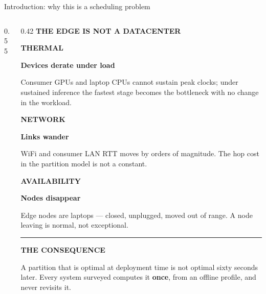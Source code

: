 \documentclass[aspectratio=169,9pt]{beamer}
\newcommand{\kicker}[1]{{\scriptsize\color{keBlue}\bfseries\MakeUppercase{#1}}\par\vspace{0.2em}}
\newcommand{\hl}[1]{\textbf{\color{keNavy}#1}}
\newenvironment{callout}[2][keBlue]{%
  \begin{beamercolorbox}[wd=\textwidth, sep=6pt, leftskip=4pt]{}%
  \setlength{\fboxrule}{0pt}%
  {\color{#1}\rule{2.5pt}{1.1em}}\hspace{0.5em}%
  {\scriptsize\color{#1}\bfseries\MakeUppercase{#2}}\par\vspace{0.25em}%
  \small
}{\end{beamercolorbox}}
\begin{document}
\begin{frame}[shrink=25]{Introduction: why this is a scheduling problem}
\begin{columns}[T]
\begin{column}{0.55\textwidth}
    \end{column}
    \begin{column}{0.42\textwidth}
      \kicker{The edge is not a datacenter}
      \scriptsize
      {\color{keOrange}\bfseries THERMAL}\par
      {\color{keNavy}\bfseries Devices derate under load}\par
      {\color{keMuted} Consumer GPUs and laptop CPUs cannot sustain peak clocks;
      under sustained inference the fastest stage becomes the bottleneck with no
      change in the workload.}
      \vspace{0.5em}

      {\color{keBlue}\bfseries NETWORK}\par
      {\color{keNavy}\bfseries Links wander}\par
      {\color{keMuted} WiFi and consumer LAN RTT moves by orders of magnitude.
      The hop cost in the partition model is not a constant.}
      \vspace{0.5em}

      {\color{keRed}\bfseries AVAILABILITY}\par
      {\color{keNavy}\bfseries Nodes disappear}\par
      {\color{keMuted} Edge nodes are laptops --- closed, unplugged, moved out of
      range. A node leaving is normal, not exceptional.}
      \vspace{0.6em}

      \begin{callout}[keNavy]{the consequence}
        \scriptsize A partition that is optimal at deployment time is not optimal
        sixty seconds later. Every system surveyed computes it \hl{once}, from an
        offline profile, and never revisits it.
      \end{callout}
    \end{column}
  \end{columns}
\end{frame}
\end{document}
